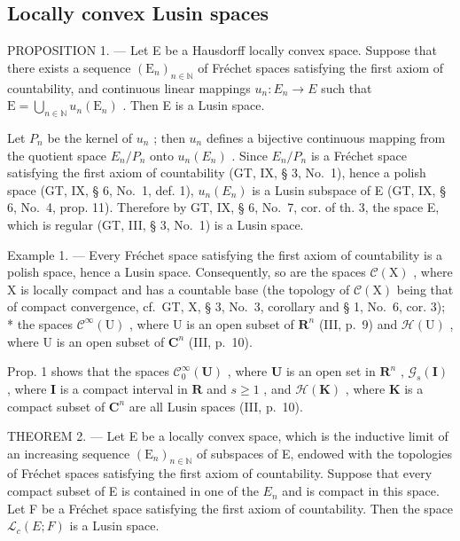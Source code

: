 \subsection{Locally convex Lusin spaces}

PROPOSITION 1. --- Let E be a Hausdorff locally convex space. Suppose that there exists a sequence \((\mathrm{E}_{n})_{n\in\mathbb{N}}\) of Fréchet spaces satisfying the first axiom of countability, and continuous linear mappings \(u_{n}:E_{n}\to E\) such that \(\mathrm{E}=\bigcup_{n\in\mathbb{N}}u_{n}(\mathrm{E}_{n})\) . Then E is a Lusin space.

Let \(P_n\) be the kernel of \(u_n\) ; then \(u_n\) defines a bijective continuous mapping from the quotient space \(E_n / P_n\) onto \(u_n(E_n)\) . Since \(E_n / P_n\) is a Fréchet space satisfying the first axiom of countability (GT, IX, § 3, No.~1), hence a polish space (GT, IX, § 6, No.~1, def. 1), \(u_n(E_n)\) is a Lusin subspace of E (GT, IX, § 6, No.~4, prop. 11). Therefore by GT, IX, § 6, No.~7, cor. of th. 3, the space E, which is regular (GT, III, § 3, No.~1) is a Lusin space.

Example 1. --- Every Fréchet space satisfying the first axiom of countability is a polish space, hence a Lusin space. Consequently, so are the spaces \(\mathcal{C}(\mathrm{X})\) , where \(\mathrm{X}\) is locally compact and has a countable base (the topology of \(\mathcal{C}(\mathrm{X})\) being that of compact convergence, cf.~GT, X, § 3, No.~3, corollary and § 1, No.~6, cor. 3); * the spaces \(\mathcal{C}^{\infty}(\mathrm{U})\) , where U is an open subset of \(\mathbf{R}^{n}\) (III, p.~9) and \(\mathcal{H}(\mathrm{U})\) , where U is an open subset of \(\mathbf{C}^{n}\) (III, p.~10).

Prop. 1 shows that the spaces \(\mathcal{C}_0^\infty (\mathbf{U})\) , where \(\mathbf{U}\) is an open set in \(\mathbf{R}^n\) , \(\mathcal{G}_s(\mathbf{I})\) , where \(\mathbf{I}\) is a compact interval in \(\mathbf{R}\) and \(s\geqslant 1\) , and \(\mathcal{H}(\mathbf{K})\) , where \(\mathbf{K}\) is a compact subset of \(\mathbf{C}^n\) are all Lusin spaces (III, p.~10).

THEOREM 2. --- Let E be a locally convex space, which is the inductive limit of an increasing sequence \((\mathrm{E}_n)_{n\in \mathbb{N}}\) of subspaces of E, endowed with the topologies of Fréchet spaces satisfying the first axiom of countability. Suppose that every compact subset of E is contained in one of the \(E_{n}\) and is compact in this space. Let F be a Fréchet space satisfying the first axiom of countability. Then the space \(\mathcal{L}_{c}(E;F)\) is a Lusin space.

